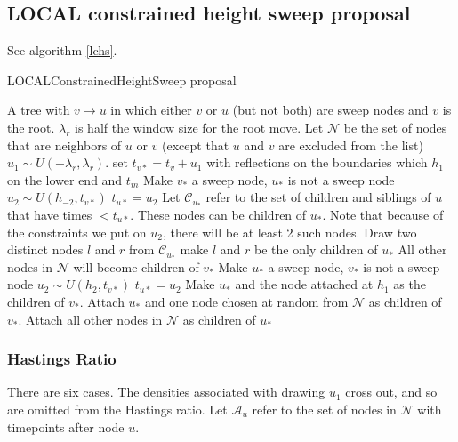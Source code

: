 \documentclass[letterpaper]{article}
\begin{document}
\subsection{LOCAL constrained height sweep proposal}
See algorithm \ref{lchs}.
\begin{algorithm} 
\caption{{\sf LOCALConstrainedHeightSweep} proposal}
\label{lchs}
\begin{algorithmic}[1]
	\REQUIRE A tree with $v\rightarrow u$ in which either $v$ or $u$ (but not both) are sweep nodes and $v$ is the root.	\REQUIRE $\lambda_r$ is half the window size for the root move.
	\STATE Let $\mathcal{N}$ be the set of nodes that are neighbors of $u$ or $v$ (except that $u$ and $v$ are excluded from the list)
	\STATE $u_1 \sim U(-\lambda_r, \lambda_r)$.
	\STATE set $t_{v*} = t_{v} + u_1$ with reflections on the boundaries which $h_1$ on the lower end and  $t_m$
		\STATE Make $v_*$ a sweep node, $u_*$ is not a sweep node
		\STATE $u_2 \sim U(h_{-2}, t_{v*})$
		\STATE $t_{u*} = u_2$
		\STATE Let $\mathcal{C}_{u_*}$ refer to the set of children and siblings of $u$ that have times $< t_{u*}$. These nodes can be children of $u_*$. Note that because of the constraints we put on $u_2$, there will be at least 2 such nodes.
		\STATE Draw two distinct nodes $l$ and $r$ from $\mathcal{C}_{u_*}$
		\STATE make $l$ and $r$ be the only children of $u_{*}$
		\STATE All other nodes in $\mathcal{N}$ will become children of $v_{*}$
	\ELSE
		\STATE Make $u_*$ a sweep node, $v_*$ is not a sweep node
		\STATE $u_2 \sim U(h_{2}, t_{v*})$
		\STATE $t_{u*} = u_2$
			\STATE Make $u_*$ and the node attached at $h_1$ as the children of $v_*$.  
		\ELSE
			\STATE Attach  $u_*$ and one node chosen at random from $\mathcal{N}$ as children of $v_*$. 
		\ENDIF
		\STATE Attach all other nodes in $\mathcal{N}$ as children of $u_{*}$
	\ENDIF
\end{algorithmic}
\end{algorithm} 
 
 
\subsubsection{Hastings Ratio}\label{HRSweepLocalRoot}
There are six cases. The densities associated with drawing $u_1$ cross out, and so are omitted from the Hastings ratio.
Let $\mathcal{A}_u$ refer to the set of nodes in $\mathcal{N}$ with timepoints after node $u$.
\end{document}
